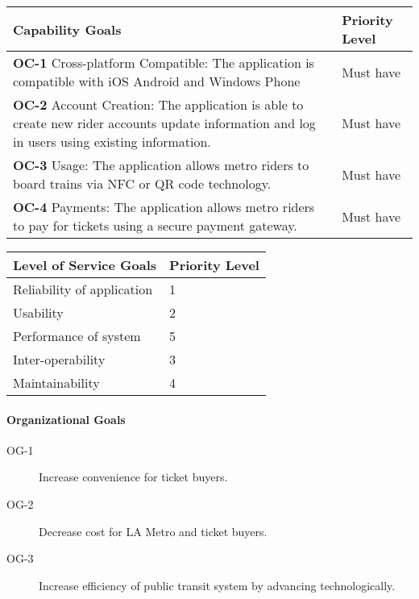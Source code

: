 \begin{table}[h]
    \begin{tabularx}{\textwidth}{Xl}\hline
    Capability Goals                                                                                                                             &  Priority Level \\
    \hline
    \textbf{OC-1} Cross-platform Compatible: The application is compatible with iOS Android and Windows Phone                                             &  Must have      \\
    \textbf{OC-2} Account Creation: The application is able to create new rider accounts update information  and log in users using existing information. & Must have       \\
    \textbf{OC-3} Usage: The application allows metro riders to board trains via NFC or QR code technology.                                               & Must have       \\
    \textbf{OC-4} Payments: The application allows metro riders to pay for tickets using a secure payment gateway.                                        & Must have       \\
    \hline
    \end{tabularx}
\end{table}

\begin{table}[h]
    \begin{tabularx}{\textwidth}{Xl}\hline
    Level of Service Goals     & Priority Level \\
    \hline
    Reliability of application & 1              \\
    Usability                  & 2              \\
    Performance of system      & 5              \\
    Inter-operability          & 3              \\
    Maintainability            & 4              \\
    \hline
    \end{tabularx}
\end{table}


\paragraph{Organizational Goals}\begin{description}
	\item[OG-1] Increase convenience for ticket buyers.
	\item[OG-2] Decrease cost for LA Metro and ticket buyers. 
	\item[OG-3] Increase efficiency of public transit system by advancing technologically.
\end{description}

